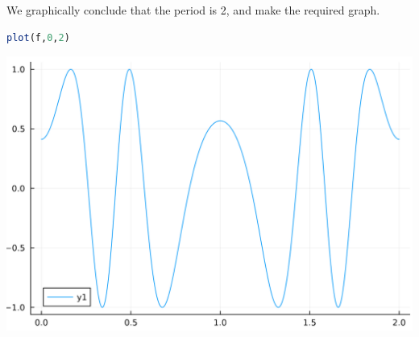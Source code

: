 \documentclass[12pt,answers]{book}
\begin{document}
We graphically conclude that the period is 2, and make the required graph.\newline
\begin{minipage}[b]{0.49\textwidth}
  \begin{lstlisting}[language=Julia]
plot(f,0,2)
  \end{lstlisting}
\end{minipage}
\begin{minipage}{0.49\textwidth}
\includegraphics[width=0.7\linewidth]{SkeletonNotes/03-graphics-3}
\end{minipage}
\end{document}
